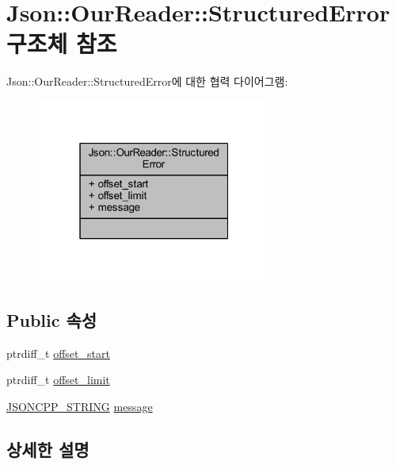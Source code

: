 \hypertarget{struct_json_1_1_our_reader_1_1_structured_error}{}\section{Json\+:\+:Our\+Reader\+:\+:Structured\+Error 구조체 참조}
\label{struct_json_1_1_our_reader_1_1_structured_error}


Json\+:\+:Our\+Reader\+:\+:Structured\+Error에 대한 협력 다이어그램\+:\nopagebreak
\begin{figure}[H]
\begin{center}
\leavevmode
\includegraphics[width=220pt]{struct_json_1_1_our_reader_1_1_structured_error__coll__graph}
\end{center}
\end{figure}
\subsection*{Public 속성}
\begin{DoxyCompactItemize}
\item 
ptrdiff\+\_\+t \hyperlink{struct_json_1_1_our_reader_1_1_structured_error_a102677698afb8177c985e72dafe72b15}{offset\+\_\+start}
\item 
ptrdiff\+\_\+t \hyperlink{struct_json_1_1_our_reader_1_1_structured_error_a15491a751a39c5153af04e68b1d0abb9}{offset\+\_\+limit}
\item 
\hyperlink{json_8h_a1e723f95759de062585bc4a8fd3fa4be}{J\+S\+O\+N\+C\+P\+P\+\_\+\+S\+T\+R\+I\+NG} \hyperlink{struct_json_1_1_our_reader_1_1_structured_error_a9d0b9986bf765d067dfcf2f971a450d1}{message}
\end{DoxyCompactItemize}


\subsection{상세한 설명}


